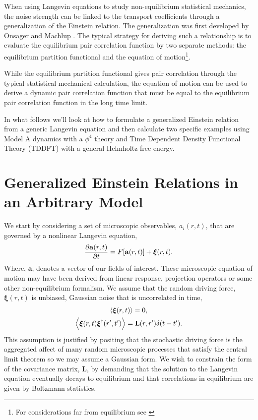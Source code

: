 \label{appendix:noise}
\label{noiseappendix}

When using Langevin equations to study non-equilibrium statistical mechanics,
the noise strength can be linked to the transport coefficients through a
generalization of the Einstein relation. The generalization was first developed
by Onsager and Machlup \cite{OnsagerMachlup}. The typical strategy for deriving
such a relationship is to evaluate the equilibrium pair correlation function by
two separate methods: the equilibrium partition functional and the equation of
motion\footnote{For considerations far from equilibrium see \cite{Lax, Ronis,
Fox_and_Uhlenbeck}}.

While the equilibrium partition functional gives pair correlation through the
typical statistical mechanical calculation, the equation of motion can be used
to derive a dynamic pair correlation function that must be equal to the
equilibrium pair correlation function in the long time limit.

In what follows we'll look at how to formulate a generalized Einstein relation
from a generic Langevin equation and then calculate two specific examples using
Model A dynamics with a $\phi^4$ theory and Time Dependent Density Functional
Theory (TDDFT) with a general Helmholtz free energy.

\section{Generalized Einstein Relations in an Arbitrary Model} %

We start by considering a set of microscopic observables, $a_i(r, t)$, that are
governed by a nonlinear Langevin equation,
%
\begin{equation} 
    \frac{\partial \mathbf{a}(r, t)}{\partial t} = 
        F[\mathbf{a}(r,t)]
      + \boldsymbol{\xi}(r,t).
\end{equation}
%
Where, $\mathbf{a}$, denotes a vector of our fields of interest. These
microscopic equation of motion may have been derived from linear response,
projection operators or some other non-equilibrium formalism. We assume that
the random driving force, $\boldsymbol{\xi}(r, t)$ is unbiased, Gaussian noise
that is uncorrelated in time,
%
\begin{gather}
    \left\langle \boldsymbol{\xi}(r,t) \right\rangle = 0, \\ 
    \label{eq:noise_form} 
    \left\langle \boldsymbol{\xi}(r,t) \boldsymbol{\xi}^\dagger(r^\prime,t^\prime) \right\rangle =
        \mathbf{L}(r, r^\prime)\delta(t-t^\prime).
\end{gather}
%
This assumption is justified by positing that the stochastic driving force is
the aggregated affect of many random microscopic processes that satisfy the
central limit theorem so we may assume a Gaussian form. We wish to constrain
the form of the covariance matrix, $\mathbf{L}$, by demanding that the solution
to the Langevin equation eventually decays to equilibrium and that correlations
in equilibrium are given by Boltzmann statistics.

